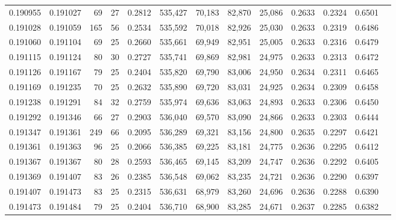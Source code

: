 \begin{tabular}{rrrrrrrrrrrrr}
0.190955 & 0.191027 &    69 &  27 &                                     0.2812 & 535,427 &  70,183 &  82,870 &  25,086 & 0.2633 & 0.2324 & 0.6501 \\
0.191028 & 0.191059 &   165 &  56 &                                     0.2534 & 535,592 &  70,018 &  82,926 &  25,030 & 0.2633 & 0.2319 & 0.6486 \\
0.191060 & 0.191104 &    69 &  25 &                                     0.2660 & 535,661 &  69,949 &  82,951 &  25,005 & 0.2633 & 0.2316 & 0.6479 \\
0.191115 & 0.191124 &    80 &  30 &                                     0.2727 & 535,741 &  69,869 &  82,981 &  24,975 & 0.2633 & 0.2313 & 0.6472 \\
0.191126 & 0.191167 &    79 &  25 &                                     0.2404 & 535,820 &  69,790 &  83,006 &  24,950 & 0.2634 & 0.2311 & 0.6465 \\
0.191169 & 0.191235 &    70 &  25 &                                     0.2632 & 535,890 &  69,720 &  83,031 &  24,925 & 0.2634 & 0.2309 & 0.6458 \\
0.191238 & 0.191291 &    84 &  32 &                                     0.2759 & 535,974 &  69,636 &  83,063 &  24,893 & 0.2633 & 0.2306 & 0.6450 \\
0.191292 & 0.191346 &    66 &  27 &                                     0.2903 & 536,040 &  69,570 &  83,090 &  24,866 & 0.2633 & 0.2303 & 0.6444 \\
0.191347 & 0.191361 &   249 &  66 &                                     0.2095 & 536,289 &  69,321 &  83,156 &  24,800 & 0.2635 & 0.2297 & 0.6421 \\
0.191361 & 0.191363 &    96 &  25 &                                     0.2066 & 536,385 &  69,225 &  83,181 &  24,775 & 0.2636 & 0.2295 & 0.6412 \\
0.191367 & 0.191367 &    80 &  28 &                                     0.2593 & 536,465 &  69,145 &  83,209 &  24,747 & 0.2636 & 0.2292 & 0.6405 \\
0.191369 & 0.191407 &    83 &  26 &                                     0.2385 & 536,548 &  69,062 &  83,235 &  24,721 & 0.2636 & 0.2290 & 0.6397 \\
0.191407 & 0.191473 &    83 &  25 &                                     0.2315 & 536,631 &  68,979 &  83,260 &  24,696 & 0.2636 & 0.2288 & 0.6390 \\
0.191473 & 0.191484 &    79 &  25 &                                     0.2404 & 536,710 &  68,900 &  83,285 &  24,671 & 0.2637 & 0.2285 & 0.6382 \\

\end{tabular}
